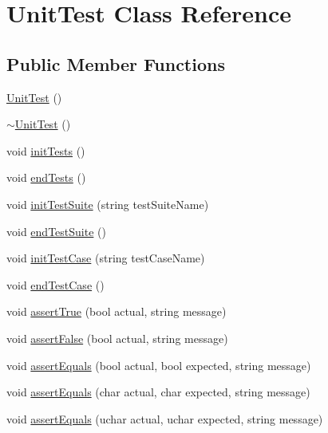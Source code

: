 \hypertarget{class_unit_test}{}\section{Unit\+Test Class Reference}
\label{class_unit_test}
\subsection*{Public Member Functions}
\begin{DoxyCompactItemize}
\item 
\mbox{\hyperlink{class_unit_test_a67ddaff817b55a624741d32550052f4b}{Unit\+Test}} ()
\item 
\mbox{\hyperlink{class_unit_test_afa0bdd3e2ac33cd52e697406339a2edf}{$\sim$\+Unit\+Test}} ()
\item 
void \mbox{\hyperlink{class_unit_test_a92a41a1b2823a2e704838f756facbb25}{init\+Tests}} ()
\item 
void \mbox{\hyperlink{class_unit_test_ada52d0c61149bd5f6fde7206a910b588}{end\+Tests}} ()
\item 
void \mbox{\hyperlink{class_unit_test_a530ead4ec4c83464dd3ebdbbab9fd700}{init\+Test\+Suite}} (string test\+Suite\+Name)
\item 
void \mbox{\hyperlink{class_unit_test_ae25097dc60a509270c0c8fd6d0b207d7}{end\+Test\+Suite}} ()
\item 
void \mbox{\hyperlink{class_unit_test_a36bf968fdd06f48ac17a0c29f6e46b41}{init\+Test\+Case}} (string test\+Case\+Name)
\item 
void \mbox{\hyperlink{class_unit_test_a21569bcf4b15137b69354ce781cb5cdc}{end\+Test\+Case}} ()
\item 
void \mbox{\hyperlink{class_unit_test_a5746fa8347d2756e0d814a08e7d1c383}{assert\+True}} (bool actual, string message)
\item 
void \mbox{\hyperlink{class_unit_test_a97b11b635d5edd950a0a0c6d63e1fdd2}{assert\+False}} (bool actual, string message)
\item 
void \mbox{\hyperlink{class_unit_test_a094449e95a634326fe16b300a46f92bd}{assert\+Equals}} (bool actual, bool expected, string message)
\item 
void \mbox{\hyperlink{class_unit_test_a515bb3599a7b1e2cc1eba6d9b29bc5cb}{assert\+Equals}} (char actual, char expected, string message)
\item 
void \mbox{\hyperlink{class_unit_test_a2c4e53109218d9ae41d8e0d5fbd6a2d7}{assert\+Equals}} (uchar actual, uchar expected, string message)
\item 

\end{DoxyCompactItemize}
